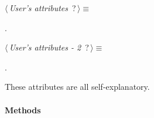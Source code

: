 	\begin{flushleft} \small
\begin{minipage}{\linewidth}\label{scrap20}\raggedright\small
{} $\langle\,${\itshape {User's attributes}}\nobreak\ {\footnotesize {?}}$\,\rangle\equiv$
\vspace{-1ex}
\begin{list}{}{} \item

                
        {\NWsep}
\end{list}
\vspace{-1.5ex}
\footnotesize
\begin{list}{}{\setlength{\itemsep}{-\parsep}\setlength{\itemindent}{-\leftmargin}}
\item {\NWtxtMacroNoRef}.

\item{}
\end{list}
\end{minipage}\vspace{4ex}
\end{flushleft}
\begin{flushleft} \small
\begin{minipage}{\linewidth}\label{scrap21}\raggedright\small
{} $\langle\,${\itshape {User's attributes - 2}}\nobreak\ {\footnotesize {?}}$\,\rangle\equiv$
\vspace{-1ex}
\begin{list}{}{} \item

                
        {\NWsep}
\end{list}
\vspace{-1.5ex}
\footnotesize
\begin{list}{}{\setlength{\itemsep}{-\parsep}\setlength{\itemindent}{-\leftmargin}}
\item {\NWtxtMacroNoRef}.

\item{}
\end{list}
\end{minipage}\vspace{4ex}
\end{flushleft}
These attributes are all self-explanatory.

\paragraph{Methods} 

